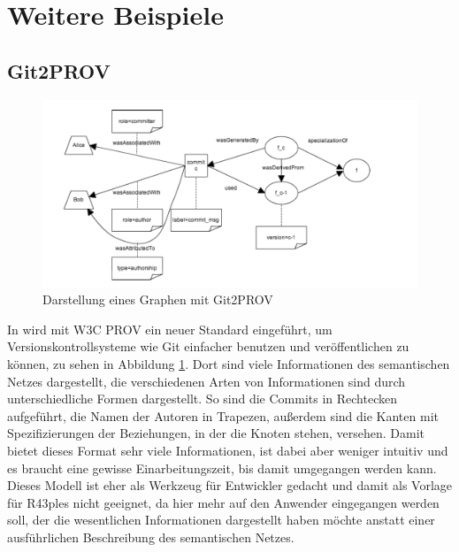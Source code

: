 \documentclass[nocolor]{tudbook}
\begin{document}
\section{Weitere Beispiele}
\label{sec:WeitereLiteratur}
\subsection{Git2PROV}
\label{sec:Git2PROV}
\begin{figure}[htbp] 
  \centering
     \includegraphics[width=\textwidth]{Git2PROV.png}
  \caption[Darstellung eines Graphen mit Git2PROV, entnommen aus \cite{Git2PROV}]{Darstellung eines Graphen mit Git2PROV}
  \label{fig:Git2PROV}
\end{figure}
In \cite{Git2PROV} wird mit W3C PROV ein neuer Standard eingeführt, um Versionskontrollsysteme wie Git einfacher benutzen und veröffentlichen zu können, zu sehen in Abbildung \ref{fig:Git2PROV}. Dort sind viele Informationen des semantischen Netzes dargestellt, die verschiedenen Arten von Informationen sind durch unterschiedliche Formen dargestellt. So sind die Commits in Rechtecken aufgeführt, die Namen der Autoren in Trapezen, außerdem sind die Kanten mit Spezifizierungen der Beziehungen, in der die Knoten stehen, versehen. Damit bietet dieses Format sehr viele Informationen, ist dabei aber weniger intuitiv und es braucht eine gewisse Einarbeitungszeit, bis damit umgegangen werden kann. Dieses Modell ist eher als Werkzeug für Entwickler gedacht und damit als Vorlage für R43ples nicht geeignet, da hier mehr auf den Anwender eingegangen werden soll, der die wesentlichen Informationen dargestellt haben möchte anstatt einer ausführlichen Beschreibung des semantischen Netzes.
\end{document}
